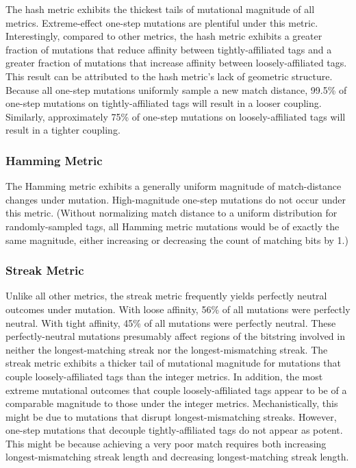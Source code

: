 The hash metric exhibits the thickest tails of mutational magnitude of all metrics.
Extreme-effect one-step mutations are plentiful under this metric.
Interestingly, compared to other metrics, the hash metric exhibits a greater fraction of mutations that reduce affinity between tightly-affiliated tags and a greater fraction of mutations that increase affinity between loosely-affiliated tags.
This result can be attributed to the hash metric's lack of geometric structure.
Because all one-step mutations uniformly sample a new match distance, 99.5\% of one-step mutations on tightly-affiliated tags will result in a looser coupling.
Similarly, approximately 75\% of one-step mutations on loosely-affiliated tags will result in a tighter coupling.

\subsubsection{Hamming Metric}

The Hamming metric exhibits a generally uniform magnitude of match-distance changes under mutation.
High-magnitude one-step mutations do not occur under this metric.
(Without normalizing match distance to a uniform distribution for randomly-sampled tags, all Hamming metric mutations would be of exactly the same magnitude, either increasing or decreasing the count of matching bits by 1.)

\subsubsection{Streak Metric}

Unlike all other metrics, the streak metric frequently yields perfectly neutral outcomes under mutation.
With loose affinity, 56\% of all mutations were perfectly neutral.
With tight affinity, 45\% of all mutations were perfectly neutral.
These perfectly-neutral mutations presumably affect regions of the bitstring involved in neither the longest-matching streak nor the longest-mismatching streak.
The streak metric exhibits a thicker tail of mutational magnitude for mutations that couple loosely-affiliated tags than the integer metrics.
In addition, the most extreme mutational outcomes that couple loosely-affiliated tags appear to be of a comparable magnitude to those under the integer metrics.
Mechanistically, this might be due to mutations that disrupt longest-mismatching streaks.
However, one-step mutations that decouple tightly-affiliated tags do not appear as potent.
This might be because achieving a very poor match requires both increasing longest-mismatching streak length and decreasing longest-matching streak length.

